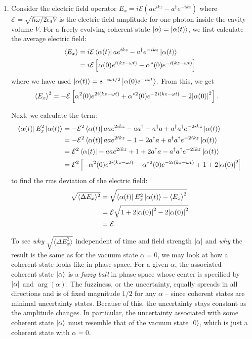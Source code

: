 \documentclass{article}
\theoremstyle{definition}
\newcommand{\al}{\alpha}
\newcommand{\lp}{\left(}
\newcommand{\rp}{\right)}
\newcommand{\lb}{\left[}
\newcommand{\rb}{\right]}
\begin{document}
\begin{enumerate}[label=\alph*)]
	
		
	\item Consider the electric field operator $E_x = i\mathcal{E}\lp ae^{ikz} - a^\dagger e^{-ikz} \rp$ where $\mathcal{E} = \sqrt{\hbar\omega/2\epsilon_0V}$ is the electric field amplitude for one photon inside the cavity volume $V$. For a freely evolving coherent state $\ket{\al} = \ket{\al(t)}$, we first calculate the average electric field:
	\begin{align*}
		\langle E_x \rangle 
		&= i\mathcal{E} \bra{\al(t)}  ae^{ikz} - a^\dagger e^{-ikz}   \ket{\al(t)} \\
		&= i\mathcal{E}\lb  \al(0) e^{i(kz - \omega t)} - \al^*(0) e^{-i(kz - \omega t)} \rb
	\end{align*}
	where we have used $\ket{\al(t)} = e^{-i\omega t/2} \ket{\al(0) e^{-i\omega t}}$. From this, we get
	\begin{align*}
		{\langle E_x \rangle}^2 &= -\mathcal{E} \lb  \al^2(0) e^{2i(kz-\omega t)}  + \al^{*2}(0) e^{-2i(kz-\omega t)} - 2 \abs{\al(0)}^2 \rb.
	\end{align*}

	Next, we calculate the term:
	\begin{align*}
		\bra{\al(t)} E_x^2 \ket{\al(t)} 
		&= -\mathcal{E}^2 \bra{\al(t)} a a e^{2ikz} -aa^\dagger - a^\dagger a + a^\dagger a^\dagger e^{-2ikz} \ket{\al(t)} \\
		&= -\mathcal{E}^2 \bra{\al(t)} a a e^{2ikz} -1  - 2a^\dagger a + a^\dagger a^\dagger e^{-2ikz} \ket{\al(t)} \\
		&= \mathcal{E}^2 \bra{\al(t)} - a a e^{2ikz} + 1  +  2a^\dagger a - a^\dagger a^\dagger e^{-2ikz} \ket{\al(t)} \\
		&= \mathcal{E}^2 \lb -\al^2(0) e^{2i(kz-\omega t)}  - \al^{*2}(0) e^{-2i(kz-\omega t)} + 1 + 2\abs{\al(0)}^2\rb
	\end{align*}
	to find the rms deviation of the electric field:
	\begin{align*}
		\sqrt{\langle \Delta E_x \rangle^2} 
		&= \sqrt{\bra{\al(t)} E_x^2 \ket{\al(t)} - {\langle E_x \rangle}^2} \\
		&= \mathcal{E}\sqrt{   1 + 2\abs{\al(0)}^2  -2\abs{\al(0)}^2  } \\
		&= \mathcal{E}.
	\end{align*}

	To see \textit{why}  $\sqrt{\langle \Delta E_x^2\rangle} $ independent of time and field strength $\abs{\al}$ and \textit{why} the result is the same as for the vacuum state $\al =0$, we may look at how a coherent state looks like in phase space. For a given $\al$, the associated coherent state $\ket{\al}$ is a \textit{fuzzy ball} in phase space whose center is specified by $\abs{\al}$ and $\arg(\al)$. The fuzziness, or the uncertainty, equally spreads in all directions and is of fixed magnitude $1/2$ for any $\al$ -- since coherent states are minimal uncertainty states. Because of this, the uncertainty stays constant as the amplitude changes. In particular, the uncertainty associated with some coherent state $\ket{\al}$ must resemble that of the vacuum state $\ket{0}$, which is just a coherent state with $\al=0$. 
\end{enumerate}
\end{document}
